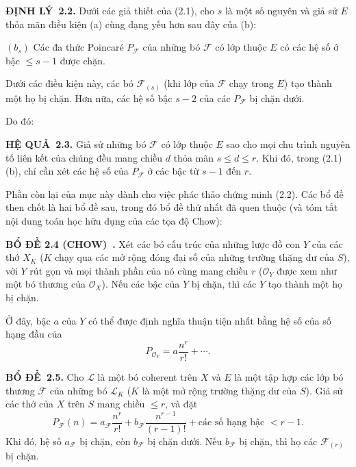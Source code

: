 \documentclass[11pt,twoside,openany]{book}
\numberwithin{equation}{section}
\newcommand{\src}[1]{%
  \phantomsection\hypertarget{src:\fgasourceid:#1}{}%
  \marginpar{\raggedleft\footnotesize\sffamily #1}%
}
\newcommand{\fgasourceid}{unset}
\newcommand{\result}[2]{\par\medskip\noindent\textbf{#1\if\relax\detokenize{#2}\relax\else\ #2\fi.}\quad}
\begin{document}
\result{ĐỊNH LÝ}{2.2} Dưới các giả thiết của (2.1), cho $s$ là một số nguyên
và giả sử $E$ thỏa mãn điều kiện (a) cùng dạng yếu hơn sau đây của (b):

\medskip
\noindent $(b_s)$ Các đa thức Poincaré $P_{\mathcal F}$ của những bó
$\mathcal F$ có lớp thuộc $E$ có các hệ số ở bậc $\leq s-1$ được chặn.

Dưới các điều kiện này, các bó $\mathcal F_{(s)}$ (khi lớp của $\mathcal F$
chạy trong $E$) tạo thành một họ bị chặn. Hơn nữa, các hệ số bậc $s-2$ của
các $P_{\mathcal F}$ bị chặn dưới.
\src{255}
Do đó:

\result{HỆ QUẢ}{2.3} Giả sử những bó $\mathcal F$ có lớp thuộc $E$ sao cho
mọi chu trình nguyên tố liên kết của chúng đều mang chiều $d$ thỏa mãn
$s\leq d\leq r$. Khi đó, trong (2.1) (b), chỉ cần xét các hệ số của
$P_{\mathcal F}$ ở các bậc từ $s-1$ đến $r$.

Phần còn lại của mục này dành cho việc phác thảo chứng minh (2.2). Các bổ đề
then chốt là hai bổ đề sau, trong đó bổ đề thứ nhất đã quen thuộc (và tóm tắt
nội dung toán học hữu dụng của các tọa độ Chow):

\result{BỔ ĐỀ 2.4 (CHOW)}{} Xét các bó cấu trúc của những lược đồ con $Y$ của
các thớ $X_K$ ($K$ chạy qua các mở rộng đóng đại số của những trường thặng dư
của $S$), với $Y$ rút gọn và mọi thành phần của nó cùng mang chiều $r$
($\mathcal O_Y$ được xem như một bó thương của $\mathcal O_X$). Nếu các bậc
của $Y$ bị chặn, thì các $Y$ tạo thành một họ bị chặn.

Ở đây, bậc $a$ của $Y$ có thể được định nghĩa thuận tiện nhất bằng hệ số của
số hạng đầu của
\[
P_{\mathcal O_Y}=a\frac{n^r}{r!}+\cdots.
\]

\result{BỔ ĐỀ}{2.5} Cho $\mathcal L$ là một bó coherent trên $X$ và $E$ là
một tập hợp các lớp bó thương $\mathcal F$ của những bó $\mathcal L_K$ ($K$
là một mở rộng trường thặng dư của $S$). Giả sử các thớ của $X$ trên $S$ mang
chiều $\leq r$, và đặt
\[
P_{\mathcal F}(n)=a_{\mathcal F}\frac{n^r}{r!}
+b_{\mathcal F}\frac{n^{r-1}}{(r-1)!}
+\text{các số hạng bậc $<r-1$}.
\]
Khi đó, hệ số $a_{\mathcal F}$ bị chặn, còn $b_{\mathcal F}$ bị chặn dưới.
Nếu $b_{\mathcal F}$ bị chặn, thì họ các $\mathcal F_{(r)}$ bị chặn.
\end{document}
